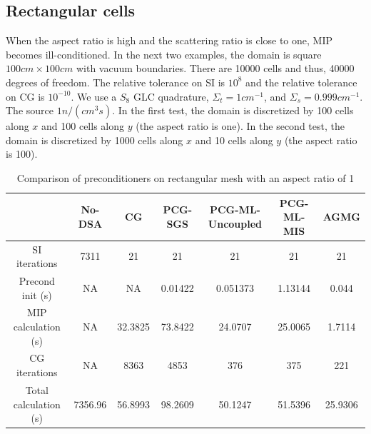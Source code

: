\subsection{Rectangular cells}
When the aspect ratio is high and the scattering ratio is close to one, MIP
becomes ill-conditioned. In the next two examples, the domain is square $100cm
\times 100cm$ with vacuum boundaries. There are 10000 cells and thus, 40000
degrees of freedom. The relative tolerance on SI is $10^{8}$ and the relative
tolerance on CG is $10^{-10}$. We use a $S_8$ GLC quadrature, $\Sigma_t =
1cm^{-1}$, and $\Sigma_s = 0.999cm^{-1}$. The source $1n/(cm^3s)$. In the
first test, the domain is discretized by 100 cells along $x$ and 100 cells
along $y$ (the aspect ratio is one). In the second test, the domain is
discretized by 1000 cells along $x$ and 10 cells along $y$ (the aspect ratio
is 100).
\begin{table}[H]
  \caption{Comparison of preconditioners on rectangular mesh with an aspect
  ratio of 1}
  \begin{center}
    \begin{tabular}{|c|c|c|c|c|c|c|}
      \hline
       & No-DSA & CG & PCG-SGS & PCG-ML-Uncoupled & PCG-ML-MIS & AGMG \\
      \hline
      SI iterations & 7311      & 21      & 21      & 21       & 21      & 21 \\
   Precond init (s) & NA        & NA      & 0.01422 & 0.051373 & 1.13144 &
      0.044 \\
MIP calculation (s) & NA        & 32.3825 & 73.8422 & 24.0707  & 25.0065 &
      1.7114 \\
      CG iterations & NA        & 8363    & 4853    & 376      & 375     &
      221\\
Total calculation (s) & 7356.96 & 56.8993 & 98.2609 & 50.1247  & 51.5396 &
      25.9306 \\
      \hline
    \end{tabular}
    \label{table_ar_1}
  \end{center}
\end{table}
